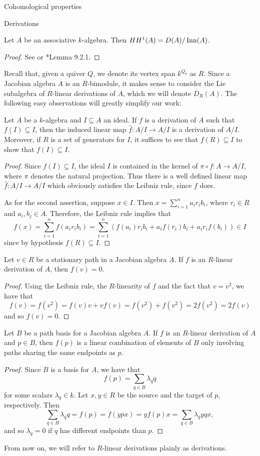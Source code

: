 \begin{chapter}{Cohomological properties}
\begin{section}{Derivations}
\begin{lemma} Let $A$ be an associative $k$-algebra. Then $HH^1(A) = D(A)/\operatorname{Inn}(A)$.
\end{lemma}
\begin{proof} See \cite{Red01} or \cite{Wei94}*{Lemma 9.2.1}.
\end{proof}

Recall that, given a quiver $Q$, we denote its vertex span $k^{Q_0}$ as $R$. Since a Jacobian algebra $A$ is an $R$-bimodule, it makes sense to consider the Lie subalgebra of $R$-linear derivations of $A$, which we will denote $D_R(A)$. The following easy observations will greatly simplify our work:
\begin{obs}\label{derivation-quotient} Let $A$ be a $k$-algebra and $I\subseteq A$ an ideal. If $f$ is a derivation of $A$ such that $f(I)\subseteq I$, then the induced linear map $\hat{f}:A/I\to A/I$ is a derivation of $A/I$. Moreover, if $R$ is a set of generators for $I$, it suffices to see that $f(R)\subseteq I$ to show that $f(I)\subseteq I$.
\end{obs}
\begin{proof} Since $f(I)\subseteq I$, the ideal $I$ is contained in the kernel of $\pi\circ f:A\to A/I$, where $\pi$ denotes the natural projection. Thus there is a well defined linear map $\hat{f}:A/I\to A/I$ which obviously satisfies the Leibniz rule, since $f$ does.

As for the second assertion, suppose $x\in I$. Then $x=\sum_{i=1}^n a_ir_ib_i$, where $r_i\in R$ and $a_i, b_j\in A$. Therefore, the Leibniz rule implies that
\[f(x) = \sum_{i=1}^n f(a_ir_ib_i)=\sum_{i=1}^n \left(f(a_i)r_ib_i + a_if(r_i)b_i + a_ir_if(b_i)\right)\in I\]
since by hypothesis $f(R)\subseteq I$.
\end{proof}
\begin{obs}\label{derivation-vertices} Let $v\in R$ be a stationary path in a Jacobian algebra $A$. If $f$ is an $R$-linear derivation of $A$, then $f(v)=0$.
\end{obs}
\begin{proof} Using the Leibniz rule, the $R$-linearity of $f$ and the fact that $v=v^2$, we have that
\[f(v)= f(v^2)= f(v)v + vf(v)=f(v^2)+ f(v^2)=2f(v^2)=2f(v)\]
and so $f(v)=0$.
\end{proof}
\begin{obs}\label{endpoints} Let $B$ be a path basis for a Jacobian algebra $A$. If $f$ is an $R$-linear derivation of $A$ and $p\in B$, then $f(p)$ is a linear combination of elements of $B$ only involving paths sharing the same endpoints as $p$.
\end{obs}
\begin{proof} Since $B$ is a basis for $A$, we have that
\[f(p) = \sum_{q\in B} \lambda_q q\]
for some scalars $\lambda_q\in k$. Let $x, y\in R$ be the source and the target of $p$, respectively. Then
\[\sum_{q\in B} \lambda_q q=f(p)=f(ypx) = yf(p)x =\sum_{q\in B} \lambda_q yqx,\]
and so $\lambda_q=0$ if $q$ has different endpoints than $p$.
\end{proof}
From now on, we will refer to $R$-linear derivations plainly as derivations.


\end{section}
\end{chapter}
